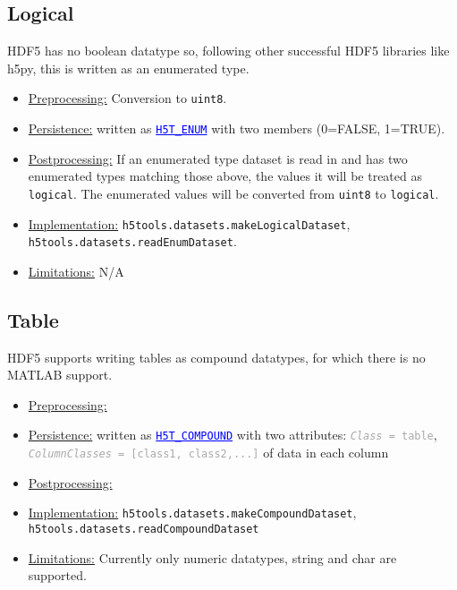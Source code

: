 \documentclass[11pt]{exam}
\newcommand\myurl[1]{\textcolor{blue}{\underline{#1}}}
\newcommand\myfcn[1]{\colorbox{codegray}{\textcolor{codeblue}{\texttt{#1}}}}
\newcommand\myatt[2]{\textcolor{darkgray}{\texttt{\textit{#1} = #2}}}
\begin{document}
		\subsection{Logical}
		\noindent HDF5 has no boolean datatype so, following other successful HDF5 libraries like h5py, this is written as an enumerated type.
		\begin{itemize}
			\item \underline{Preprocessing:} Conversion to \texttt{uint8}.
			\item \underline{Persistence:} written as \myurl{\texttt{H5T\_ENUM}} with two members (0=FALSE, 1=TRUE). 
			\item \underline{Postprocessing:} If an enumerated type dataset is read in and has two enumerated types matching those above, the values it will be treated as \texttt{logical}. The enumerated values will be converted from \texttt{uint8} to \texttt{logical}. 
			\item \underline{Implementation:} \texttt{h5tools.datasets.makeLogicalDataset}, \texttt{h5tools.datasets.readEnumDataset}.
			\item \underline{Limitations:} N/A
		\end{itemize}
		
		\subsection{Table}
		\noindent HDF5 supports writing tables as compound datatypes, for which there is no MATLAB support.
		\begin{itemize}
			\item \underline{Preprocessing:} 
			\item \underline{Persistence:} written as \myurl{\texttt{H5T\_COMPOUND}} with two attributes: \myatt{Class}{table}, \myatt{ColumnClasses}{[class1, class2,...]} of data in each column
			\item \underline{Postprocessing:} 
			\item \underline{Implementation:} \myfcn{h5tools.datasets.makeCompoundDataset}, \myfcn{h5tools.datasets.readCompoundDataset}
			\item \underline{Limitations:} Currently only numeric datatypes, string and char are supported.
		\end{itemize}
		
\end{document}
